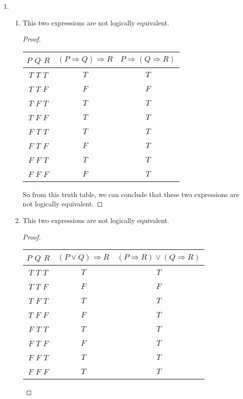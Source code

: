 \documentclass{article}
\begin{document}
\begin{enumerate}
        \item 
        \begin{enumerate}
            \item 
            This two expressions are not logically equivalent.
            \begin{proof}
                \begin{tabular}{c|c|c} $P$ $Q$ $R$ & $(P \Rightarrow Q) \Rightarrow R$ & $P \Rightarrow (Q \Rightarrow R)$\\\hline
                    $T$ $T$ $T$ & $T$ & $T$\\
                    $T$ $T$ $F$ & $F$ & $F$\\
                    $T$ $F$ $T$ & $T$ & $T$\\
                    $T$ $F$ $F$ & $T$ & $T$\\
                    $F$ $T$ $T$ & $T$ & $T$\\
                    $F$ $T$ $F$ & $F$ & $T$\\
                    $F$ $F$ $T$ & $T$ & $T$\\
                    $F$ $F$ $F$ & $F$ & $T$\\
                \end{tabular}

                So from this truth table, we can conclude that these two expressions are not logically equivalent.
            \end{proof}
            \item 
            This two expressions are not logically equivalent.
            \begin{proof}
                \begin{tabular}{c|c|c} $P$ $Q$ $R$ & $(P \vee Q) \Rightarrow R$ & $(P \Rightarrow R) \vee (Q \Rightarrow R)$\\\hline
                    $T$ $T$ $T$ & $T$ & $T$\\
                    $T$ $T$ $F$ & $F$ & $F$\\
                    $T$ $F$ $T$ & $T$ & $T$\\
                    $T$ $F$ $F$ & $F$ & $T$\\
                    $F$ $T$ $T$ & $T$ & $T$\\
                    $F$ $T$ $F$ & $F$ & $T$\\
                    $F$ $F$ $T$ & $T$ & $T$\\
                    $F$ $F$ $F$ & $T$ & $T$\\
                \end{tabular}


\end{proof}
\end{enumerate}
\end{enumerate}
\end{document}
